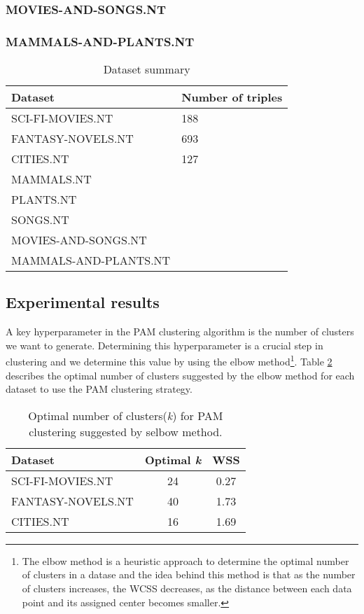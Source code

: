 \documentclass{ieeeaccess}
\begin{document}
\subsubsection{MOVIES-AND-SONGS.NT}

\subsubsection{MAMMALS-AND-PLANTS.NT}

\begin{table}[!htb]
\caption{Dataset summary}
\label{tab:symbols}
\centering
\begin{tabular}{ll}
     \toprule
     \textbf{Dataset} & 
     \textbf{Number of triples} 
     \\
     \midrule
     SCI-FI-MOVIES.NT & 188 \\
     FANTASY-NOVELS.NT & 693 \\
     CITIES.NT & 127 \\
     MAMMALS.NT &  \\
     PLANTS.NT &  \\
     SONGS.NT &  \\
     MOVIES-AND-SONGS.NT &  \\
     MAMMALS-AND-PLANTS.NT &  \\
     \bottomrule
\end{tabular}
\end{table}



\subsection{Experimental results}

A key hyperparameter in the PAM clustering algorithm is the number of clusters 
we want to generate. Determining this hyperparameter is
a crucial step in clustering and we determine this value by using the elbow 
method\footnote{The elbow method is a heuristic approach to determine the 
optimal number of clusters in a datase and the idea behind this method is that
as the number of clusters increases, the WCSS decreases, as the distance between 
each data point and its assigned center becomes smaller.}. Table \ref{tab:elbow_numbers} describes the optimal number of clusters 
suggested by the elbow method for each dataset to use the PAM clustering strategy.

\begin{table}[!htb]
\caption{Optimal number of clusters(\textit{k}) for PAM clustering suggested by 
selbow method.}
\label{tab:elbow_numbers}
\centering
\begin{tabular}{lcc}
     \toprule
     \textbf{Dataset} & 
     \textbf{Optimal \textit{k}} &
     \textbf{WSS}
     \\
     \midrule
     SCI-FI-MOVIES.NT & 24 & 0.27 \\
     FANTASY-NOVELS.NT & 40 & 1.73 \\
     CITIES.NT & 16 & 1.69 \\
     
     
     \bottomrule
\end{tabular}
\end{table}
\end{document}
